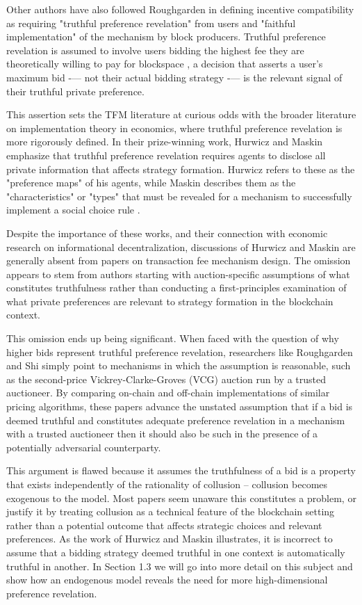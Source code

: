 \documentclass[oneside]{article}   	%
\begin{document}
Other authors have also followed Roughgarden in defining incentive compatibility as requiring "truthful preference revelation" from users and "faithful implementation" of the mechanism by block producers. Truthful preference revelation is assumed to involve users bidding the highest fee they are theoretically willing to pay for blockspace \cite{roughgarden2024, chung2023foundations}, a decision that asserts a user’s maximum bid -— not their actual bidding strategy -— is the relevant signal of their truthful private preference.

This assertion sets the TFM literature at curious odds with the broader literature on implementation theory in economics, where truthful preference revelation is more rigorously defined. In their prize-winning work, Hurwicz and Maskin emphasize that truthful preference revelation requires agents to disclose all private information that affects strategy formation. Hurwicz refers to these as the "preference maps" of his agents, while Maskin describes them as the "characteristics" or "types" that must be revealed for a mechanism to successfully implement a social choice rule \cite{hurwicz1973design, hurwicz1960optimality, hurwicz2007guardians, hurwicz1979allocations, maskin1999nash, maskin2002}.

Despite the importance of these works, and their connection with economic research on informational decentralization, discussions of Hurwicz and Maskin are generally absent from papers on transaction fee mechanism design. The omission appears to stem from authors starting with auction-specific assumptions of what constitutes truthfulness rather than conducting a first-principles examination of what private preferences are relevant to strategy formation in the blockchain context.

This omission ends up being significant. When faced with the question of why higher bids represent truthful preference revelation, researchers like Roughgarden and Shi simply point to mechanisms in which the assumption is reasonable, such as the second-price Vickrey-Clarke-Groves (VCG) auction run by a trusted auctioneer. By comparing on-chain and off-chain implementations of similar pricing algorithms, these papers advance the unstated assumption that if a bid is deemed truthful and constitutes adequate preference revelation in a mechanism with a trusted auctioneer then it should also be such in the presence of a potentially adversarial counterparty.

This argument is flawed because it assumes the truthfulness of a bid is a property that exists independently of the rationality of collusion -- collusion becomes exogenous to the model. Most papers seem unaware this constitutes a problem, or justify it by treating collusion as a technical feature of the blockchain setting rather than a potential outcome that affects strategic choices and relevant preferences. As the work of Hurwicz and Maskin illustrates, it is incorrect to assume that a bidding strategy deemed truthful in one context is automatically truthful in another. In Section 1.3 we will go into more detail on this subject and show how an endogenous model reveals the need for more high-dimensional preference revelation.
\end{document}
